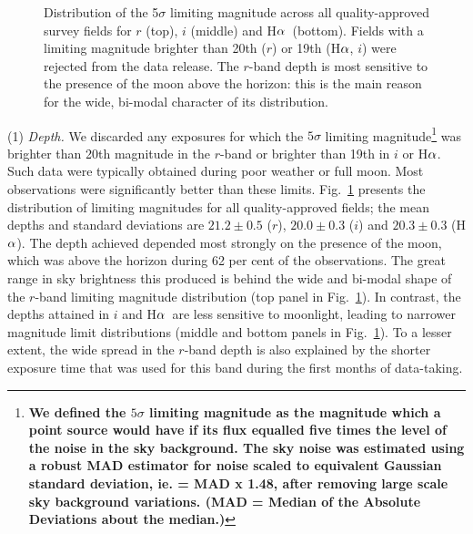 \documentclass[a4paper,useAMS,usenatbib]{mn2e}
\def\ha{\mbox{H$\rm \alpha$}}
\begin{document}
\begin{figure}
\begin{minipage}[b]{\linewidth}
    \end{minipage}
    \caption{Distribution of the 5$\sigma$ limiting magnitude
             across all quality-approved survey fields
             for $r$ (top), $i$ (middle) and \ha\ (bottom).
             Fields with a limiting magnitude brighter than
             20th ($r$) or 19th (\ha, $i$) were rejected
             from the data release.
             The $r$-band depth is most sensitive 
             to the presence of the moon above the horizon: 
             this is the main reason for the wide, bi-modal character
             of its distribution.}
    \label{fig:depth}
\end{figure}

(1) \emph{Depth.} 
We discarded any exposures 
for which the $5\sigma$ limiting magnitude\footnote{\bf
We defined the $5\sigma$ limiting magnitude
as the magnitude which a point source would have
if its flux equalled five times the level of the noise in the sky background.
The sky noise was estimated using a robust MAD estimator 
for noise scaled to equivalent Gaussian standard deviation,
ie. = MAD x 1.48,
after removing large scale sky background variations.
(MAD = Median of the Absolute Deviations about the median.)}
was brighter than 20th magnitude in the $r$-band
or brighter than 19th in $i$ or \ha.
Such data were typically obtained during poor weather or full moon.
Most observations were significantly better than these limits.
Fig.~\ref{fig:depth} presents the distribution of limiting magnitudes
for all quality-approved fields;
the mean depths and standard deviations are 
$21.2\pm0.5$ ($r$), $20.0\pm0.3$ ($i$) and $20.3\pm0.3$ (\ha).
The depth achieved depended
most strongly on the presence of the moon,
which was above the horizon during 62 per cent 
of the observations.
The great range in sky brightness this
produced is behind the wide and bi-modal shape
of the $r$-band limiting magnitude distribution 
(top panel in Fig.~\ref{fig:depth}).
In contrast, the depths attained in $i$ and \ha\ 
are less sensitive to moonlight, leading to
narrower magnitude limit distributions
(middle and bottom panels in Fig.~\ref{fig:depth}).
To a lesser extent, the wide spread in the $r$-band depth
is also explained by the shorter exposure time
that was used for this band during the first months of data-taking.
\end{document}
